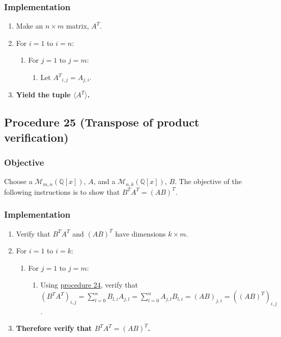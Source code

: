 \documentclass[twocolumn]{article}
\begin{document}
			\subsubsection{Implementation}
				\begin{enumerate}
					\item Make an $n\times m$ matrix, $A^T$.
					\item For $i=1$ to $i=n$:
					\begin{enumerate}
						\item For $j=1$ to $j=m$:
						\begin{enumerate}
							\item Let ${A^T}_{i,j}=A_{j,i}$.
						\end{enumerate}
					\end{enumerate}
					\item \textbf{Yield the tuple $\langle A^T\rangle$.}
				\end{enumerate}
		\subsection{Procedure 25 (Transpose of product verification)}\label{sec:procedure 25}
			\subsubsection{Objective}
				Choose a $\mathcal{M}_{m,n}(\mathbb{Q}[x])$, $A$, and a $\mathcal{M}_{n,k}(\mathbb{Q}[x])$, $B$. The objective of the following instructions is to show that $B^TA^T=(AB)^T$.
			\subsubsection{Implementation}
				\begin{enumerate}
					\item Verify that $B^TA^T$ and $(AB)^T$ have dimensions $k\times m$.
					\item For $i=1$ to $i=k$:
					\begin{enumerate}
						\item For $j=1$ to $j=m$:
						\begin{enumerate}
							\item Using \hyperref[sec:procedure 24]{procedure 24}, verify that $(B^TA^T)_{i,j}=\sum_{l=0}^n B_{l,i}A_{j,l}=\sum_{l=0}^n A_{j,l}B_{l,i}=(AB)_{j,i}=((AB)^T)_{i,j}$.
						\end{enumerate}
					\end{enumerate}
					\item \textbf{Therefore verify that $B^TA^T=(AB)^T$.}
				\end{enumerate}
\end{document}
